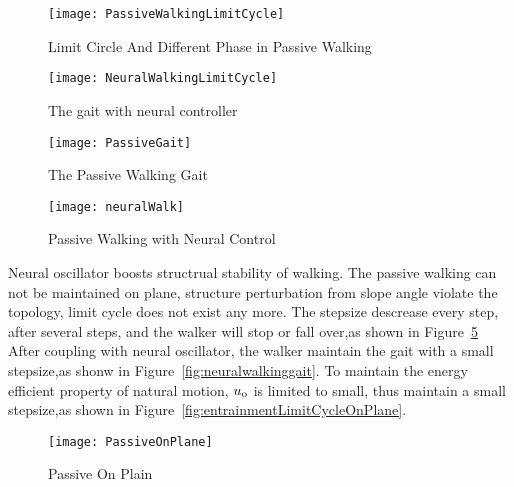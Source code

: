 \begin{figure}[!htbp]
  \begin{center}
    \texttt{[image: PassiveWalkingLimitCycle]}
    \caption{Limit Circle And Different Phase in Passive Walking}
    \label{fig:passivegaitlimitcycle}
\end{center}
\end{figure}


\begin{figure}[!htbp]
  \begin{center}

      \texttt{[image: NeuralWalkingLimitCycle]}
    \caption{The gait with neural controller}
    \label{fig:entrainmentgaitlimitcyle}
\end{center}
\end{figure}

\begin{figure}[!htbp]
  \begin{center}
     \texttt{[image: PassiveGait]}
    \caption{The Passive Walking Gait}
    \label{fig:passivegait}
\end{center}
\end{figure}

\begin{figure}[!htbp]
  \begin{center}
     \texttt{[image: neuralWalk]}
    \caption{Passive Walking with Neural Control}
    \label{fig:entrainmentgait}
\end{center}
\end{figure}



Neural oscillator  boosts structrual stability of walking. 
The passive walking can not be maintained on plane, structure perturbation from slope angle violate the topology, limit cycle does not exist any more.
The stepsize descrease every step, after several steps, and the walker will stop or fall over,as shown in Figure~\ref{fig:passivegaitplane}
After coupling with neural oscillator, the  walker maintain the gait with a small stepsize,as shonw in Figure~\ref{fig:neuralwalkinggait}.
To maintain the energy efficient property of natural motion, $u_{\mathrm{o}}$ is limited to small, thus maintain a small stepsize,as shown in Figure~\ref{fig:entrainmentLimitCycleOnPlane}.

\begin{figure}[!htbp]
  \begin{center}
    \texttt{[image: PassiveOnPlane]}
    \caption{Passive On Plain}
    \label{fig:passivegaitplane}
\end{center}
\end{figure}

